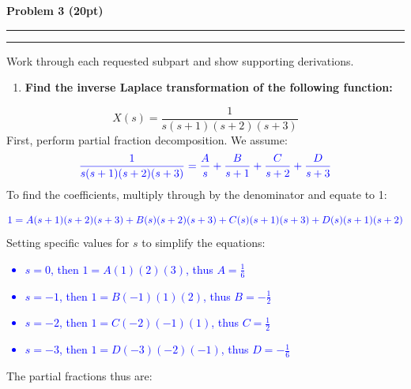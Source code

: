 \documentclass[12pt]{article}
\newcommand{\question}[1]{%
  \clearpage
  \vspace{0.5cm}
  {\noindent\normalsize \textbf{#1}}
  \vspace{0.2cm}
  \hrule
  \vspace{0.1cm}
  \hrule
  \vspace{0.3cm}
}
\begin{document}
\question{Problem 3 (20pt)}\label{quest:3}
\begin{stepbox}
Work through each requested subpart and show supporting derivations.
\end{stepbox}

\begin{enumerate}
	\item[(a)] \textbf{Find the inverse Laplace transformation of the following function:}
\end{enumerate}

\[
	X(s) = \frac{1}{s(s+1)(s+2)(s+3)}
\]
First, perform partial fraction decomposition. We assume:
\[
	\textcolor{blue}{\frac{1}{s(s+1)(s+2)(s+3)} = \frac{A}{s} + \frac{B}{s+1} + \frac{C}{s+2} + \frac{D}{s+3}}
\]
To find the coefficients, multiply through by the denominator and equate to 1:
       
\[
	\textcolor{blue}{1 = A(s+1)(s+2)(s+3) + B(s)(s+2)(s+3) + C(s)(s+1)(s+3) + D(s)(s+1)(s+2)}
\]
Setting specific values for \(s\) to simplify the equations:

\textcolor{blue}{\begin{itemize}
	\item \(s = 0\), then \(1 = A(1)(2)(3)\), thus \(A = \frac{1}{6}\)
	\item \(s = -1\), then \(1 = B(-1)(1)(2)\), thus \(B = -\frac{1}{2}\)
	\item \(s = -2\), then \(1 = C(-2)(-1)(1)\), thus \(C = \frac{1}{2}\)
	\item \(s = -3\), then \(1 = D(-3)(-2)(-1)\), thus \(D = -\frac{1}{6}\)
	\end{itemize}}
\noindent The partial fractions thus are:
\end{document}
